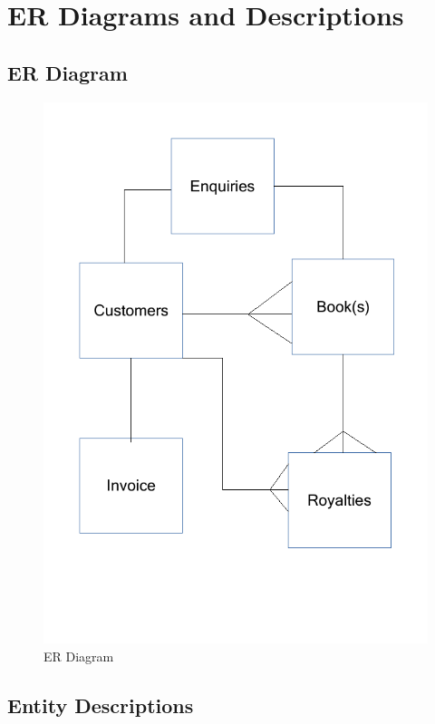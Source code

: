 \section{ER Diagrams and Descriptions}

\subsection{ER Diagram}

\begin{figure}[H]
    \caption{ER Diagram} \label{ER_Diagram.pdf}
    \includegraphics[width=\textwidth]{./Analysis/ER_Diagram.pdf}
\end{figure}

\subsection{Entity Descriptions}

